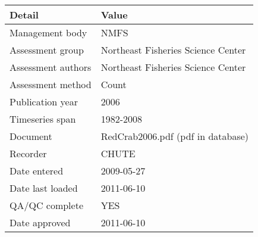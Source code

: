 \begin{table}[htb]
\centering
\begin{tabular}{lp{7cm}}
\toprule
Detail & Value \\
\midrule
Management body    & NMFS                               \\
Assessment group   & Northeast Fisheries Science Center \\
Assessment authors & Northeast Fisheries Science Center \\
Assessment method  & Count                              \\
Publication year   & 2006                               \\
Timeseries span    & 1982-2008                          \\
Document           & RedCrab2006.pdf (pdf in database)  \\
Recorder           & CHUTE                              \\
Date entered       & 2009-05-27                         \\
Date last loaded   & 2011-06-10                         \\
QA/QC complete     & YES                                \\
Date approved      & 2011-06-10                         \\
\bottomrule
\end{tabular}
\label{tab:assessdet}
\end{table}
